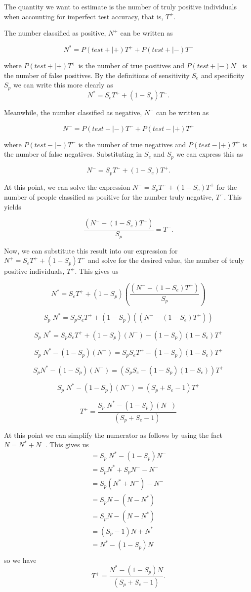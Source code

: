 \documentclass[12pt,twoside]{smiththesis}
\begin{document}
The quantity we want to estimate is the number of truly positive individuals when accounting for imperfect test accuracy, that is, \(T^+\).

The number classified as positive, \(N^+\) can be written as

\[ N^* = P(test + | +) T^+ + P(test + | -) T^-\]

where \(P(test + | +) T^+\) is the number of true positives and \(P(test + | -) N^-\) is the number of false positives. By the definitions of sensitivity \(S_e\) and specificity \(S_p\) we can write this more clearly as
\[ N^* =S_e T^+ + (1-S_p) T^-.\]

Meanwhile, the number classified as negative, \(N^-\) can be written as

\[ N^- = P(test - | -) T^- + P(test - | +) T^+\]

where \(P(test - | -) T^-\) is the number of true negatives and \(P(test - | +) T^+\) is the number of false negatives. Substituting in \(S_e\) and \(S_p\) we can express this as

\[ N^- = S_p T^- + (1-S_e) T^+.\]

At this point, we can solve the expression \(N^- = S_p T^- + (1-S_e) T^+\) for the number of people classified as positive for the number truly negative, \(T^-\). This yields

\[\dfrac{( N^- - (1-S_e) T^+) }{S_p}=  T^- .\]

Now, we can substitute this result into our expression for \(N^+ =S_e T^+ + (1-S_p) T^-\) and solve for the desired value, the number of truly positive individuals, \(T^+\). This gives us

\[
 N^* =S_e T^+ + (1-S_p)  \left( \dfrac{( N^- - (1-S_e) T^+) }{S_p} \right)
\]

\[
 S_p \; N^* =S_pS_e T^+ + (1-S_p)  \left( {( N^- - (1-S_e) T^+) } \right)
\]

\[
 S_p \; N^* =S_pS_e T^+ + (1-S_p)  ( N^-)  - (1-S_p)(1-S_e) T^+
\]

\[
 S_p \; N^* -   (1-S_p)  ( N^-) =S_pS_e T^+  - (1-S_p)(1-S_e) T^+
\]

\[
 S_p N^* -   (1-S_p)  ( N^-) = (S_pS_e  - (1-S_p)(1-S_e)) T^+
\]

\[
 S_p \; N^* -   (1-S_p)  ( N^-) = (S_p + S_e - 1) T^+
\]

\[
 T^+ = \dfrac{ S_p \; N^* -   (1-S_p)  ( N^-)}{(S_p + S_e - 1)} 
\]

At this point we can simplify the numerator as follows by using the fact \(N =N^* + N^-\). This gives us
\begin{align*} =S_p \;N^* -   (1-S_p)  N^-\\
=  S_p   N^* + S_p  N^- - N^-\\
=  S_p(N^* +  N^-) - N^- \\
=  S_pN - (N-N^*) \\
=  S_pN - (N-N^*) \\
=  (S_p-1)N + N^* \\
=  N^* - (1-S_p)N\\
\end{align*}
so we have
\[
 T^+ = \dfrac{ N^*- (1-S_p)N}{(S_p + S_e - 1)}.
\]
\end{document}
